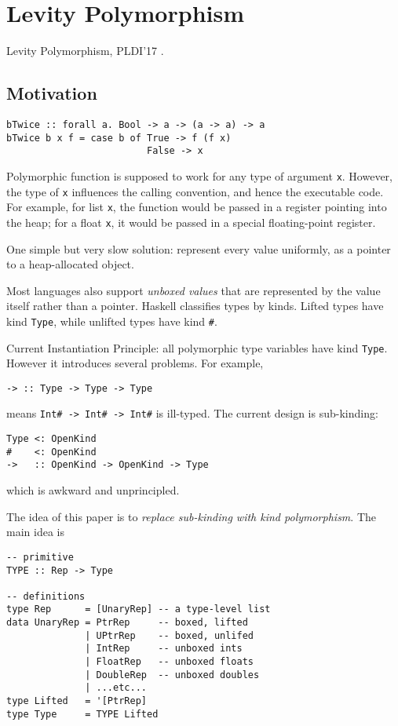 \section{Levity Polymorphism}

Levity Polymorphism, PLDI'17 \citep{eisenberg2017levity}.

\subsection{Motivation}

\begin{verbatim}
bTwice :: forall a. Bool -> a -> (a -> a) -> a
bTwice b x f = case b of True -> f (f x)
                         False -> x
\end{verbatim}

Polymorphic function is supposed to work for any type of argument \verb|x|.
However, the type of \verb|x| influences the calling convention, and hence the
executable code. For example, for list \verb|x|, the function would be passed in
a register pointing into the heap; for a float \verb|x|, it would be passed in a
special floating-point register. 

One simple but very slow solution: represent every value uniformly, as a
pointer to a heap-allocated object.

Most languages also support \textit{unboxed values} that are represented by the
value itself rather than a pointer. Haskell classifies types by kinds. Lifted
types have kind \verb|Type|, while unlifted types have kind \verb|#|.

Current Instantiation Principle: all polymorphic type variables have kind \verb|Type|.
However it introduces several problems. For example,
\begin{verbatim}
-> :: Type -> Type -> Type
\end{verbatim}
means \verb|Int# -> Int# -> Int#| is ill-typed.
The current design is sub-kinding:

\begin{verbatim}
Type <: OpenKind
#    <: OpenKind
->   :: OpenKind -> OpenKind -> Type
\end{verbatim}
which is awkward and unprincipled.

The idea of this paper is to \textit{replace sub-kinding with kind
  polymorphism}. The main idea is

\begin{verbatim}
-- primitive
TYPE :: Rep -> Type   

-- definitions
type Rep      = [UnaryRep] -- a type-level list
data UnaryRep = PtrRep     -- boxed, lifted
              | UPtrRep    -- boxed, unlifed
              | IntRep     -- unboxed ints
              | FloatRep   -- unboxed floats
              | DoubleRep  -- unboxed doubles
              | ...etc...
type Lifted   = '[PtrRep]
type Type     = TYPE Lifted
\end{verbatim}

